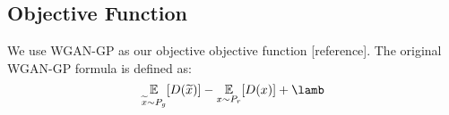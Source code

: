 \subsection{Objective Function}
We use WGAN-GP as our objective objective function [reference]. The original WGAN-GP formula is defined as:
\begin{equation}
\underset{\widetilde{x} \sim P_g}{\mathbb{E}}[D(\widetilde{x})] - \underset{x \sim P_r}{\mathbb{E}}[D(x)] + \lamb
\end{equation}